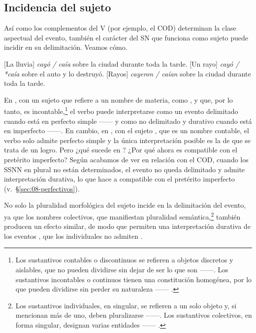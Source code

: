 \subsection{Incidencia del sujeto}\label{sec:08-sujeto}

Así como los complementos del V (por ejemplo, el COD) determinan la clase
aspectual del evento, también el carácter del SN que funciona como sujeto puede
incidir en su delimitación. Veamos cómo.

\begin{exe}
  \ex\label{ex:08-lluvia} {}[La lluvia] \textit{cayó / caía} sobre la ciudad
      durante toda la tarde.
  \ex\label{ex:08-rayo} {}[Un rayo] \textit{cayó / *caía} sobre el auto y lo
      destruyó.
  \ex\label{ex:08-rayos} {}[Rayos] \textit{cayeron / caían} sobre la ciudad
      durante toda la tarde.
\end{exe}

En , con un sujeto que refiere a un nombre de materia, como
, y que, por lo tanto, es incontable,\footnote{Los sustantivos
contables o discontinuos se refieren a objetos discretos y aislables, que no
pueden dividirse sin dejar de ser lo que son ------.
Los sustantivos incontables o continuos tienen una constitución homogénea, por
lo que pueden dividirse sin perder su naturaleza ------
\parencite[30]{giammatteo2009}.} el verbo  puede interpretarse como
un evento delimitado cuando está en perfecto simple ------ y como no
delimitado y durativo cuando está en imperfecto ------. En cambio,
en , con el sujeto , que es un nombre contable,
el verbo solo admite perfecto simple y la única interpretación posible es la de
que se trata de un logro. Pero ¿qué sucede en ? ¿Por qué
ahora  es compatible con el pretérito imperfecto? Según acabamos de
ver en relación con el COD, cuando los SSNN en plural no están determinados, el
evento no queda delimitado y admite interpretación durativa, lo que hace a
 compatible con el pretérito imperfecto (v.~§\ref{sec:08-perfectivos}).

No solo la pluralidad morfológica del sujeto incide en la delimitación del
evento, ya que los nombres colectivos, que manifiestan pluralidad
semántica,\footnote{Los sustantivos individuales, en singular, se refieren a un
solo objeto y, si mencionan más de uno, deben pluralizarse ------. Los sustantivos colectivos, en forma
singular, designan varias entidades ------
\parencite[31]{giammatteo2009}.} también producen un efecto similar, de modo que
permiten una interpretación durativa de los eventos , que
los individuales no admiten .

